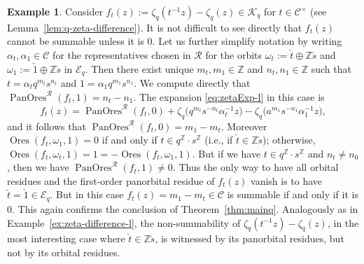 \documentclass[preprint,12pt]{elsarticle}
\numberwithin{equation}{section} %
\theoremstyle{theorem}
\theoremstyle{definition}
\newtheorem{example}[theorem]{Example}
\newcommand{\Cq}{\mathcal{C}} %
\newcommand{\Ca}{\mathcal{C}} %
\newcommand{\bk}{\mathcal{K}} %
\newcommand{\bkq}{\bk_{q}} %
\newcommand{\ec}{\mathcal{E}} %
\newcommand{\ecq}{\ec_{q}}
\newcommand{\Z}{\mathbb{Z}} %
\newcommand{\zq}{\zeta_{q}}
\DeclareMathOperator{\ores}{Ores}
\DeclareMathOperator{\pano}{PanOres}
\begin{document}
 \begin{example} \label{ex:zeta-difference-q} Consider $f_t(z):=\zq(t^{-1}z)-\zq(z)\in\bkq$ for $t\in\Cq^\times$ (see Lemma~\ref{lem:q-zeta-difference}). It is not difficult to see directly that $f_t(z)$ cannot be summable unless it is $0$. Let us further simplify notation by writing $\alpha_t,\alpha_1\in\Cq$ for the representatives chosen in $\mathcal{R}$ for the orbits $\omega_t:=\check{t}\oplus\Z\check{s}$ and $\omega_1:=\check{1}\oplus\Z \check{s}$ in $\ecq$. Then there exist unique $m_t,m_1\in\Z$ and $n_t,n_1\in\Z$ such that $t=\alpha_tq^{m_t}s^{n_t}$ and $1=\alpha_1q^{m_1}s^{n_1}$. We compute directly that $\pano^\mathcal{R}(f_t,1)=n_t-n_1$. The expansion \eqref{eq:zetaExp-l} in this case is \[f_t(z)=\pano^\mathcal{R}(f_t,0)+\zq\bigl(q^{m_t}s^{-n_t}\alpha_t^{-1}z\bigr)-\zq\bigl(a^{m_1}s^{-n_1}\alpha_1^{-1}z\bigr),\] and it follows that $\pano^\mathcal{R}(f_t,0)=m_1-m_t$. Moreover $\ores(f_t,\omega_1,1)=0$ if and only if $t\in q^\Z\cdot s^\Z$ (i.e., if $\check{t}\in\Z\check{s}$); otherwise, $\ores(f_t,\omega_t,1)=1=-\ores(f_t,\omega_1,1)$. But if we have $t\in q^\Z\cdot s^\Z$ and $n_t\neq n_0$, then we have $\pano^\mathcal{R}(f_t,1)\neq 0$. Thus the only way to have all orbital residues and the first-order panorbital residue of $f_t(z)$ vanish is to have $\check{t}=\check{1}\in\ecq$. But in this case $f_t(z)=m_1-m_t\in\Ca$ is summable if and only if it is $0$. This again confirms the conclusion of Theorem~\ref{thm:mainq}. Analogously as in Example~\ref{ex:zeta-difference-l}, the non-summability of $\zq(t^{-1}z)-\zq(z)$, in the most interesting case where $\check{t}\in\Z\check{s}$, is witnessed by its panorbital residues, but not by its orbital residues.\end{example}
\end{document}
